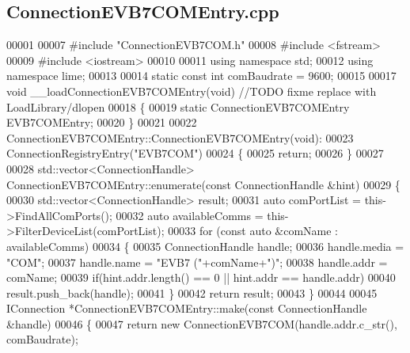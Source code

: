 \subsection{Connection\+E\+V\+B7\+C\+O\+M\+Entry.\+cpp}
\label{ConnectionEVB7COMEntry_8cpp_source}

\begin{DoxyCode}
00001 
00007 \textcolor{preprocessor}{#include "ConnectionEVB7COM.h"}
00008 \textcolor{preprocessor}{#include <fstream>}
00009 \textcolor{preprocessor}{#include <iostream>}
00010 
00011 \textcolor{keyword}{using namespace }std;
00012 \textcolor{keyword}{using namespace }lime;
00013 
00014 \textcolor{keyword}{static} \textcolor{keyword}{const} \textcolor{keywordtype}{int} comBaudrate = 9600;
00015 
00017 \textcolor{keywordtype}{void} __loadConnectionEVB7COMEntry(\textcolor{keywordtype}{void}) \textcolor{comment}{//TODO fixme replace with LoadLibrary/dlopen}
00018 \{
00019 \textcolor{keyword}{static} ConnectionEVB7COMEntry EVB7COMEntry;
00020 \}
00021 
00022 ConnectionEVB7COMEntry::ConnectionEVB7COMEntry(\textcolor{keywordtype}{void}):
00023     ConnectionRegistryEntry(\textcolor{stringliteral}{"EVB7COM"})
00024 \{
00025     \textcolor{keywordflow}{return};
00026 \}
00027 
00028 std::vector<ConnectionHandle> ConnectionEVB7COMEntry::enumerate(\textcolor{keyword}{const} 
      ConnectionHandle &hint)
00029 \{
00030     std::vector<ConnectionHandle> result;
00031     \textcolor{keyword}{auto} comPortList = this->FindAllComPorts();
00032     \textcolor{keyword}{auto} availableComms = this->FilterDeviceList(comPortList);
00033     \textcolor{keywordflow}{for} (\textcolor{keyword}{const} \textcolor{keyword}{auto} &comName : availableComms)
00034     \{
00035         ConnectionHandle handle;
00036         handle.media = \textcolor{stringliteral}{"COM"};
00037         handle.name = \textcolor{stringliteral}{"EVB7 ("}+comName+\textcolor{stringliteral}{")"};
00038         handle.addr = comName;
00039         \textcolor{keywordflow}{if}(hint.addr.length() == 0 || hint.addr == handle.addr)
00040             result.push\_back(handle);
00041     \}
00042     \textcolor{keywordflow}{return} result;
00043 \}
00044 
00045 IConnection *ConnectionEVB7COMEntry::make(\textcolor{keyword}{const} ConnectionHandle &handle)
00046 \{
00047     \textcolor{keywordflow}{return} \textcolor{keyword}{new} ConnectionEVB7COM(handle.addr.c\_str(), comBaudrate);

\end{DoxyCode}
